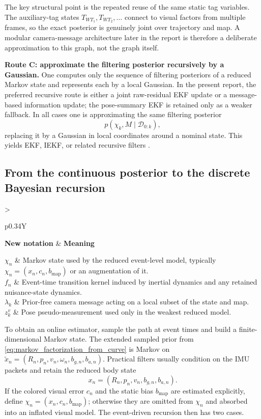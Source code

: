 \documentclass[11pt]{report}
\newcommand{\NotationTable}[1]{%
\vspace{0.6mm}
{\scriptsize
\setlength{\tabcolsep}{2.5pt}
\begin{tabularx}{\columnwidth}{>{\raggedright\arraybackslash}p{0.34\columnwidth}Y}
\toprule
\textbf{New notation} & \textbf{Meaning}\\
\midrule
#1\\
\bottomrule
\end{tabularx}}
\vspace{0.8mm}}
\begin{document}
The key structural point is the repeated reuse of the same static tag variables. The auxiliary-tag states $T_{WT_1},T_{WT_2},\ldots$ connect to visual factors from multiple frames, so the exact posterior is genuinely joint over trajectory and map. A modular camera-message architecture later in the report is therefore a deliberate approximation to this graph, not the graph itself.

\textbf{Route C: approximate the filtering posterior recursively by a Gaussian.} One computes only the sequence of filtering posteriors of a reduced Markov state and represents each by a local Gaussian. In the present report, the preferred recursive route is either a joint raw-residual EKF update or a message-based information update; the pose-summary EKF is retained only as a weaker fallback. In all cases one is approximating the same filtering posterior
\begin{equation}
p(\chi_k,M\mid \mathcal D_{0:k}),
\end{equation}
replacing it by a Gaussian in local coordinates around a nominal state. This yields EKF, IEKF, or related recursive filters \citep{mourikis2007msckf,barrau2017invariant,sarkka2023bayesian}.

\subsection{From the continuous posterior to the discrete Bayesian recursion}
\NotationTable{
$\chi_n$ & Markov state used by the reduced event-level model, typically $\chi_n=(x_n,c_n,b_{\mathrm{map}})$ or an augmentation of it.\\
$f_n$ & Event-time transition kernel induced by inertial dynamics and any retained nuisance-state dynamics.\\
$\lambda_k$ & Prior-free camera message acting on a local subset of the state and map.\\
$z_k^v$ & Pose pseudo-measurement used only in the weakest reduced model.}

To obtain an online estimator, sample the path at event times and build a finite-dimensional Markov state. The extended sampled prior from \eqref{eq:markov_factorization_from_curve} is Markov on $\tilde x_n=(R_n,p_n,v_n,\omega_n,b_{g,n},b_{a,n})$. Practical filters usually condition on the IMU packets and retain the reduced body state
\[
x_n=(R_n,p_n,v_n,b_{g,n},b_{a,n}).
\]
If the colored visual error $c_n$ and the static bias $b_{\mathrm{map}}$ are estimated explicitly, define $\chi_n=(x_n,c_n,b_{\mathrm{map}})$; otherwise they are omitted from $\chi_n$ and absorbed into an inflated visual model. The event-driven recursion then has two cases.
\end{document}
